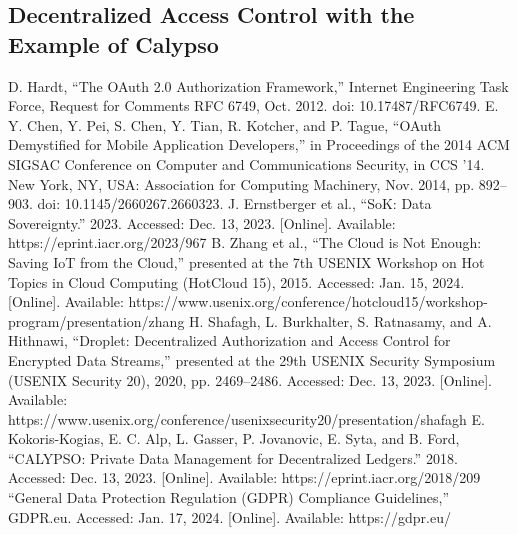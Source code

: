 \documentclass[conference]{IEEEtran}
\begin{document}
\subsection{Decentralized Access Control with the Example of Calypso}

\begin{thebibliography}{00}
 D. Hardt, “The OAuth 2.0 Authorization Framework,” Internet Engineering Task Force, Request for Comments RFC 6749, Oct. 2012. doi: 10.17487/RFC6749.
 E. Y. Chen, Y. Pei, S. Chen, Y. Tian, R. Kotcher, and P. Tague, “OAuth Demystified for Mobile Application Developers,” in Proceedings of the 2014 ACM SIGSAC Conference on Computer and Communications Security, in CCS ’14. New York, NY, USA: Association for Computing Machinery, Nov. 2014, pp. 892–903. doi: 10.1145/2660267.2660323.
 J. Ernstberger et al., “SoK: Data Sovereignty.” 2023. Accessed: Dec. 13, 2023. [Online]. Available: https://eprint.iacr.org/2023/967
 B. Zhang et al., “The Cloud is Not Enough: Saving {IoT} from the Cloud,” presented at the 7th USENIX Workshop on Hot Topics in Cloud Computing (HotCloud 15), 2015. Accessed: Jan. 15, 2024. [Online]. Available: https://www.usenix.org/conference/hotcloud15/workshop-program/presentation/zhang
 H. Shafagh, L. Burkhalter, S. Ratnasamy, and A. Hithnawi, “Droplet: Decentralized Authorization and Access Control for Encrypted Data Streams,” presented at the 29th USENIX Security Symposium (USENIX Security 20), 2020, pp. 2469–2486. Accessed: Dec. 13, 2023. [Online]. Available: https://www.usenix.org/conference/usenixsecurity20/presentation/shafagh
 E. Kokoris-Kogias, E. C. Alp, L. Gasser, P. Jovanovic, E. Syta, and B. Ford, “CALYPSO: Private Data Management for Decentralized Ledgers.” 2018. Accessed: Dec. 13, 2023. [Online]. Available: https://eprint.iacr.org/2018/209
 “General Data Protection Regulation (GDPR) Compliance Guidelines,” GDPR.eu. Accessed: Jan. 17, 2024. [Online]. Available: https://gdpr.eu/



\end{thebibliography}
\end{document}
